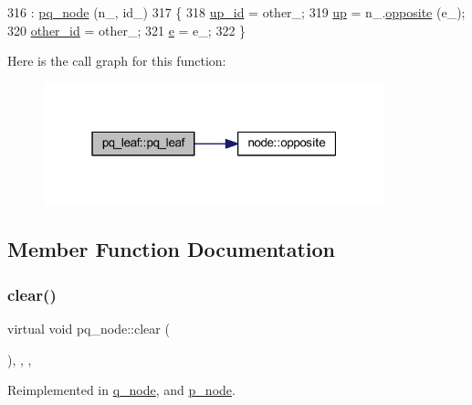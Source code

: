 \begin{DoxyCode}
316                                                        : \mbox{\hyperlink{classpq__node_a75720c94fd6e2865ba24c76ff66b33b2}{pq\_node}} (n\_, id\_) 
317 \{
318     \mbox{\hyperlink{classpq__node_a5a7bcdde1f57191a77a6a14994b38a50}{up\_id}} = other\_;
319     \mbox{\hyperlink{classpq__node_ae6d5a236397b9a57159487eac7ec168d}{up}} = n\_.\mbox{\hyperlink{classnode_a13dbd1809a33a5efede64a359e53a363}{opposite}} (e\_);
320     \mbox{\hyperlink{classpq__leaf_a4f4e0c05ee8e704fb1be7b04bae11b43}{other\_id}} = other\_;
321     \mbox{\hyperlink{classpq__leaf_a9edebd6049b8633158d7f1db3c33ee7c}{e}} = e\_;
322 \}
\end{DoxyCode}
Here is the call graph for this function\+:\nopagebreak
\begin{figure}[H]
\begin{center}
\leavevmode
\includegraphics[width=280pt]{classpq__leaf_a5478f8f28b4661ec404c492a01ac1f34_cgraph}
\end{center}
\end{figure}


\subsection{Member Function Documentation}
\mbox{\label{classpq__node_a13100e0b030cc047f382d9ddf6a44f4a}} 
\subsubsection{\texorpdfstring{clear()}{clear()}}
{\footnotesize\ttfamily virtual void pq\+\_\+node\+::clear (\begin{DoxyParamCaption}{ }\end{DoxyParamCaption})\hspace{0.3cm}{\ttfamily [inline]}, {\ttfamily [protected]}, {\ttfamily [virtual]}, {\ttfamily [inherited]}}



Reimplemented in \mbox{\hyperlink{classq__node_a47908b6f23cab25667f20eb41ad2f09d}{q\+\_\+node}}, and \mbox{\hyperlink{classp__node_af24fe11743b0836b03c108a1bf8a0995}{p\+\_\+node}}.




